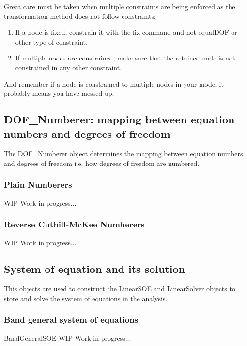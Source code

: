 Great care must be taken when multiple constraints are being enforced as the transformation method does not follow constraints: 

\begin{enumerate}
\item If a node is fixed, constrain it with the fix command and not equalDOF or other type of constraint.
\item If multiple nodes are constrained, make sure that the retained node is not constrained in any other constraint.
\end{enumerate}

And remember if a node is constrained to multiple nodes in your model it probably means you have messed up. 

\subsection{DOF\_Numberer: mapping between equation numbers and degrees of freedom}
The DOF\_Numberer object determines the mapping between equation numbers and degrees of freedom i.e. how degrees of freedom are numbered.

\subsubsection{Plain Numberers}
WIP Work in progress...

\subsubsection{Reverse Cuthill-McKee Numberers}
WIP Work in progress...



\subsection{System of equation and its solution}
This objects are used to construct the LinearSOE and LinearSolver objects to store and solve the system of equations in the analysis.

\subsubsection{Band general system of equations}
BandGeneralSOE WIP Work in progress...

